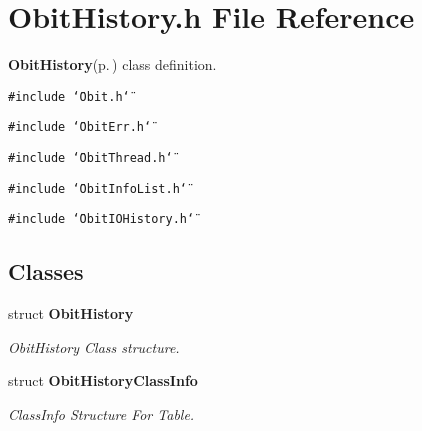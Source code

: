 \section{Obit\-History.h File Reference}
\label{ObitHistory_8h}
{\bf Obit\-History}{\rm (p.\,\pageref{structObitHistory})} class definition. 

{\tt \#include \char`\"{}Obit.h\char`\"{}}\par
{\tt \#include \char`\"{}Obit\-Err.h\char`\"{}}\par
{\tt \#include \char`\"{}Obit\-Thread.h\char`\"{}}\par
{\tt \#include \char`\"{}Obit\-Info\-List.h\char`\"{}}\par
{\tt \#include \char`\"{}Obit\-IOHistory.h\char`\"{}}\par
\subsection*{Classes}
\begin{CompactItemize}
\item 
struct {\bf Obit\-History}
\begin{CompactList}\small\item\em Obit\-History Class structure. \item\end{CompactList}\item 
struct {\bf Obit\-History\-Class\-Info}
\begin{CompactList}\small\item\em Class\-Info Structure For Table. \item\end{CompactList}\end{CompactItemize}
